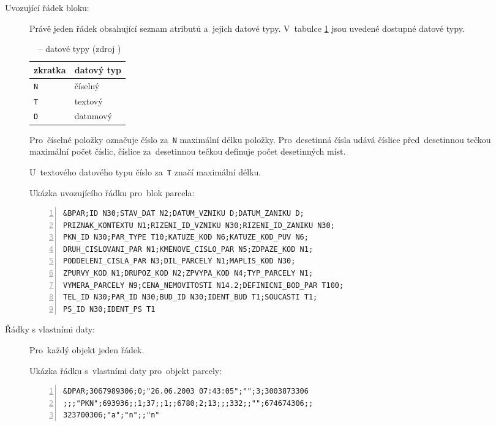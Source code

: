 \begin{description}	
	\item[Uvozující řádek bloku:] Právě jeden řádek obsahující seznam atributů a~jejich datové typy. V~tabulce \ref{tab:datove_typy} jsou uvedené dostupné datové typy.

\begin{table}[H]
    \begin{tabular}{|l|l|}
        \hline
         zkratka & datový typ \\
        \hline
        \hline
         \texttt{N} & číselný \\ \hline
         \texttt{T} & textový \\ \hline
         \texttt{D} & datumový \\
         \hline
    \end{tabular}
    \centering
    \caption[~– datové typy]{~– datové typy (zdroj \citep{struktura_vfk})}
    \label{tab:datove_typy}
\end{table}

Pro~číselné položky označuje číslo za~\texttt{N} maximální délku položky. Pro~desetinná čísla udává číslice před~desetinnou tečkou maximální počet číslic, číslice za~desetinnou tečkou definuje počet desetinných míst.

U~textového datového typu číslo za~\texttt{T} značí maximální délku.

Ukázka uvozujícího řádku pro~blok parcela:

	\begin{lstlisting}[basicstyle=\footnotesize\ttfamily, backgroundcolor = \color{light-gray},  numbers=left]
&BPAR;ID N30;STAV_DAT N2;DATUM_VZNIKU D;DATUM_ZANIKU D;
PRIZNAK_KONTEXTU N1;RIZENI_ID_VZNIKU N30;RIZENI_ID_ZANIKU N30;
PKN_ID N30;PAR_TYPE T10;KATUZE_KOD N6;KATUZE_KOD_PUV N6;
DRUH_CISLOVANI_PAR N1;KMENOVE_CISLO_PAR N5;ZDPAZE_KOD N1;
PODDELENI_CISLA_PAR N3;DIL_PARCELY N1;MAPLIS_KOD N30;
ZPURVY_KOD N1;DRUPOZ_KOD N2;ZPVYPA_KOD N4;TYP_PARCELY N1;
VYMERA_PARCELY N9;CENA_NEMOVITOSTI N14.2;DEFINICNI_BOD_PAR T100;
TEL_ID N30;PAR_ID N30;BUD_ID N30;IDENT_BUD T1;SOUCASTI T1;
PS_ID N30;IDENT_PS T1
	\end{lstlisting}

	\item[Řádky s vlastními daty:] Pro~každý objekt jeden řádek.

Ukázka řádku s~vlastními daty pro~objekt parcely:
	
	\begin{lstlisting}[basicstyle=\footnotesize\ttfamily, backgroundcolor = \color{light-gray},  numbers=left]
&DPAR;3067989306;0;"26.06.2003 07:43:05";"";3;3003873306
;;;"PKN";693936;;1;37;;1;;6780;2;13;;;332;;"";674674306;;
323700306;"a";"n";;"n"
	\end{lstlisting}
\end{description}

